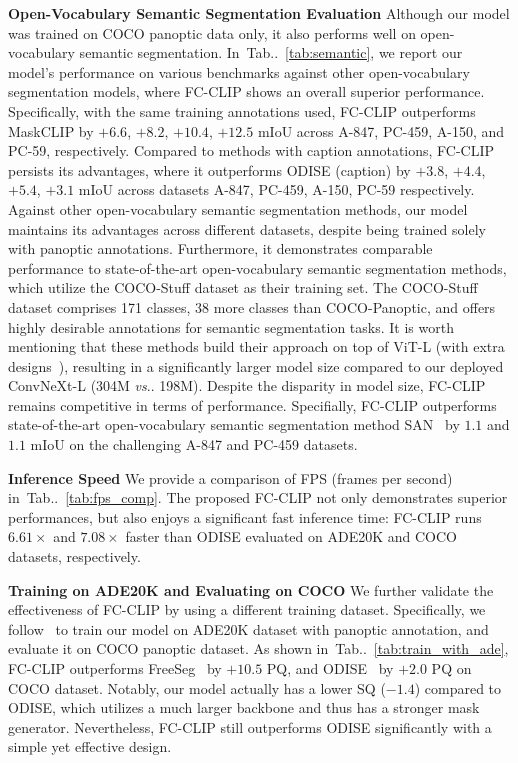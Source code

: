\documentclass{article}
\makeatletter
\DeclareRobustCommand\onedot{\futurelet\@let@token\@onedot}
\def\@onedot{\ifx\@let@token.\else.\null\fi\xspace}
\def\vs{\emph{vs}\onedot}
\newcommand{\tabref}[1]{Tab\onedot~\ref{#1}}
\newcommand{\modelname}{FC-CLIP\xspace}
\makeatother
\begin{document}
\noindent \textbf{Open-Vocabulary Semantic Segmentation Evaluation}\quad
Although our model was trained on COCO panoptic data only, it also performs well on open-vocabulary semantic segmentation. In~\tabref{tab:semantic}, we report our model's performance on various benchmarks against other open-vocabulary segmentation models, where \modelname shows an overall superior performance. Specifically, with the same training annotations used, \modelname outperforms MaskCLIP by $+6.6$, $+8.2$, $+10.4$, $+12.5$ mIoU across A-847, PC-459, A-150, and PC-59, respectively. Compared to methods with caption annotations, \modelname persists its advantages, where it outperforms ODISE (caption) by $+3.8$, $+4.4$, $+5.4$, $+3.1$ mIoU across datasets A-847, PC-459, A-150, PC-59 respectively.
Against other open-vocabulary semantic segmentation methods, our model maintains its advantages across different datasets, despite being trained solely with panoptic annotations. Furthermore, it demonstrates comparable performance to state-of-the-art open-vocabulary semantic segmentation methods, which utilize the COCO-Stuff dataset as their training set. The COCO-Stuff dataset comprises 171 classes, 38 more classes than COCO-Panoptic, and offers highly desirable annotations for semantic segmentation tasks. It is worth mentioning that these methods build their approach on top of ViT-L (with extra designs~\cite{xu2023side}), resulting in a significantly larger model size compared to our deployed ConvNeXt-L (304M \vs 198M). Despite the disparity in model size, \modelname remains competitive in terms of performance. Specifially, \modelname outperforms state-of-the-art open-vocabulary semantic segmentation method SAN~\cite{xu2023side} by $1.1$ and $1.1$ mIoU on the challenging A-847 and PC-459 datasets. 

\noindent \textbf{Inference Speed}\quad
We provide a comparison of FPS (frames per second) in~\tabref{tab:fps_comp}. The proposed \modelname not only demonstrates superior performances, but also enjoys a significant fast inference time: \modelname runs $6.61\times$ and $7.08\times$ faster than ODISE evaluated on ADE20K and COCO datasets, respectively.


\noindent \textbf{Training on ADE20K and Evaluating on COCO}\quad
We further validate the effectiveness of \modelname by using a different training dataset.
Specifically, we follow~\cite{qin2023freeseg,xu2023open} to train our model on ADE20K dataset with panoptic annotation, and evaluate it on COCO panoptic dataset. As shown  in~\tabref{tab:train_with_ade},
\modelname outperforms FreeSeg~\cite{qin2023freeseg} by $+10.5$ PQ, and ODISE~\cite{xu2023open} by $+2.0$ PQ on COCO dataset.
Notably, our model actually has a lower SQ ($-1.4$) compared to ODISE, which utilizes a much larger backbone and thus has a stronger mask generator.
Nevertheless, \modelname still outperforms ODISE significantly with a simple yet effective design.
\end{document}

